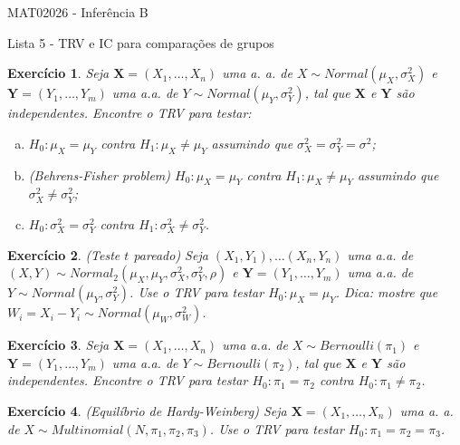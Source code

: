 \documentclass[letter,11pt]{article}
\newtheorem{exer}{Exercício}
\begin{document}
\begin{center}{ \Large MAT02026 - Inferência B }\end{center}

\begin{center}
{\large  \sc Lista 5 - TRV e IC para comparações de grupos}
\end{center}
\vspace{5mm}

\begin{exer} \rm
Seja $\boldsymbol{X} = (X_1, \ldots, X_n)$ uma a. a. de $X \sim Normal(\mu_X, \sigma^2_X)$ e $\boldsymbol{Y} = (Y_1, \ldots, Y_m)$ uma a.a. de $Y \sim Normal(\mu_Y, \sigma^2_Y)$, tal que $\boldsymbol{X}$ e $\boldsymbol{Y}$ são independentes. Encontre o TRV para testar:
\begin{enumerate}[a)]
  \item $H_0: \mu_X = \mu_Y$ contra $H_1: \mu_X \neq \mu_Y$ assumindo que $\sigma^2_X = \sigma^2_Y = \sigma^2$;
  \item \textit{(Behrens-Fisher problem)} $H_0: \mu_X = \mu_Y$ contra $H_1: \mu_X \neq \mu_Y$ assumindo que $\sigma^2_X \neq \sigma^2_Y$;
  \item $H_0: \sigma^2_X = \sigma^2_Y$ contra $H_1: \sigma^2_X \neq \sigma^2_Y$.   
\end{enumerate}
\end{exer}


\begin{exer} \rm
\textit{(Teste $t$ pareado)} Seja $(X_1, Y_1), \ldots (X_n, Y_n)$ uma a.a. de $(X, Y) \sim Normal_2(\mu_X, \mu_Y, \sigma^2_X, \sigma^2_Y, \rho)$ e $\boldsymbol{Y} = (Y_1, \ldots, Y_m)$ uma a.a. de $Y \sim Normal(\mu_Y, \sigma^2_Y)$. Use o TRV para testar $H_0: \mu_X = \mu_Y$. Dica: mostre que $W_i = X_i - Y_i \sim Normal(\mu_W, \sigma^2_W)$. 
\end{exer}


\begin{exer} \rm
Seja $\boldsymbol{X} = (X_1, \ldots, X_n)$ uma a.a. de $X \sim Bernoulli(\pi_1)$ e $\boldsymbol{Y} = (Y_1, \ldots, Y_m)$ uma a.a. de $Y \sim Bernoulli(\pi_2)$, tal que $\boldsymbol{X}$ e $\boldsymbol{Y}$ são independentes. Encontre o TRV para testar $H_0: \pi_1 = \pi_2$ contra $H_0: \pi_1 \neq \pi_2$.
\end{exer}


\begin{exer} \rm
\textit{(Equilíbrio de Hardy-Weinberg)} Seja $\boldsymbol{X} = (X_1, \ldots, X_n)$ uma a. a. de $X \sim Multinomial(N, \pi_1, \pi_2, \pi_3)$. Use o TRV para testar $H_0: \pi_1 = \pi_2 = \pi_3$.  
\end{exer}
\end{document}
